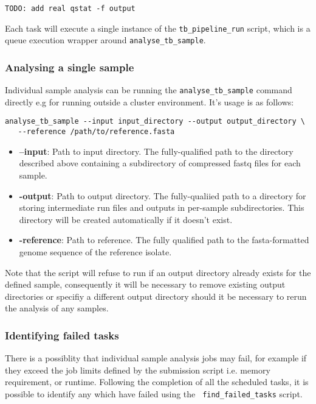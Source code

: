 \documentclass[a4paper,10pt,twoside]{article}
\begin{document}
\begin{verbatim}
TODO: add real qstat -f output
\end{verbatim}

Each task will execute a single instance of the {\tt tb\_pipeline\_run} script,
which is a queue execution wrapper around {\tt analyse\_tb\_sample}.

\subsubsection {Analysing a single sample}

Individual sample analysis can be running the {\tt analyse\_tb\_sample} command
directly e.g for running outside a cluster environment. It's usage is as follows:

\begin{verbatim}
analyse_tb_sample --input input_directory --output output_directory \
   --reference /path/to/reference.fasta
\end{verbatim}

\begin{itemize}
\item \textbf{--input}: Path to input directory. The fully-qualified path to
the directory described above containing a subdirectory of compressed fastq
files for each sample.
 \item \textbf{-output}: Path to output directory. The fully-qualiied path to a
directory for storing intermediate run files and outputs in per-sample
subdirectories. This directory will be created automatically if it doesn't
exist. 
\item \textbf{-reference}: Path to reference. The fully qualified path to the
fasta-formatted genome sequence of the reference isolate.
\end{itemize}

Note that the script will refuse to run if an output directory already exists
for the defined sample, consequently it will be necessary to remove existing
output directories or specifiy a different output directory should it be
necessary to rerun the analysis of any samples. 

\subsubsection{Identifying failed tasks}

There is a possiblity that individual sample analysis jobs may fail, for
example if they exceed the job limits defined by the submission script i.e.
memory requirement, or runtime. Following the completion of all the scheduled
tasks, it is possible to identify any which have failed using the {\tt
find\_failed\_tasks} script.
\end{document}

